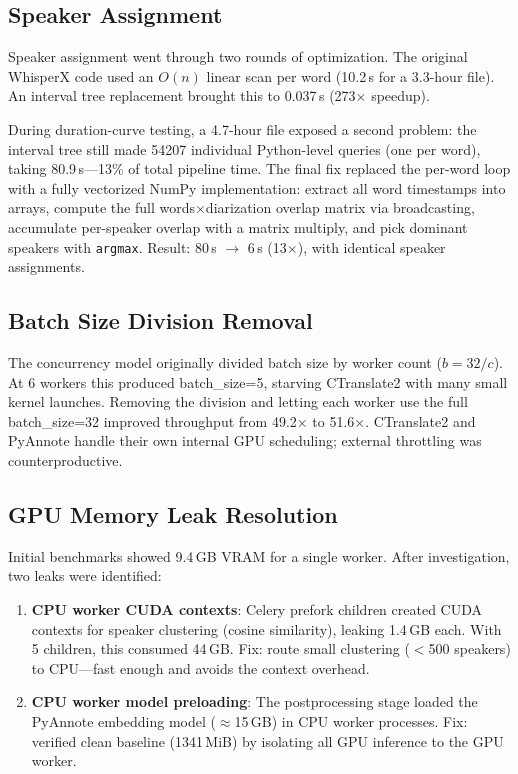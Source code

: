 \documentclass[conference,10pt]{IEEEtran}
\begin{document}
\subsection{Speaker Assignment}

Speaker assignment went through two rounds of optimization. The original
WhisperX code used an $O(n)$ linear scan per word (10.2\,s for a 3.3-hour
file). An interval tree replacement brought this to 0.037\,s
(273$\times$ speedup).

During duration-curve testing, a 4.7-hour file exposed a second problem: the
interval tree still made \num{54207} individual Python-level queries (one per
word), taking 80.9\,s---13\% of total pipeline time. The final fix replaced
the per-word loop with a fully vectorized NumPy implementation: extract all
word timestamps into arrays, compute the full words$\times$diarization overlap
matrix via broadcasting, accumulate per-speaker overlap with a matrix multiply,
and pick dominant speakers with \texttt{argmax}. Result: 80\,s $\to$ 6\,s
(13$\times$), with identical speaker assignments.

\subsection{Batch Size Division Removal}
\label{sec:batchfix}

The concurrency model originally divided batch size by worker count
($b = 32/c$). At 6 workers this produced batch\_size=5, starving CTranslate2
with many small kernel launches. Removing the division and letting each worker
use the full batch\_size=32 improved throughput from 49.2$\times$ to
51.6$\times$. CTranslate2 and PyAnnote handle their own internal GPU
scheduling; external throttling was counterproductive.

\subsection{GPU Memory Leak Resolution}
\label{sec:leaks}

Initial benchmarks showed 9.4\,GB VRAM for a single worker. After
investigation, two leaks were identified:

\begin{enumerate}[nosep,leftmargin=*]
  \item \textbf{CPU worker CUDA contexts}: Celery prefork children created
    CUDA contexts for speaker clustering (cosine similarity), leaking
    1.4\,GB each. With 5 children, this consumed 44\,GB. Fix: route
    small clustering ($<$500 speakers) to CPU---fast enough and avoids
    the context overhead.
  \item \textbf{CPU worker model preloading}: The postprocessing stage
    loaded the PyAnnote embedding model ($\approx$15\,GB) in CPU worker
    processes. Fix: verified clean baseline (\num{1341}\,MiB) by
    isolating all GPU inference to the GPU worker.
\end{enumerate}
\end{document}
